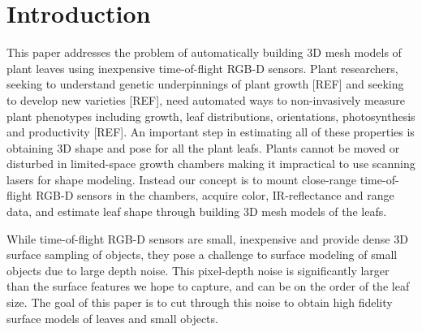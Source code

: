 \section{Introduction}
\label{sec:intro}

This paper addresses the problem of automatically building $3$D mesh models of plant leaves using inexpensive time-of-flight RGB-D sensors.  Plant researchers, seeking to understand genetic underpinnings of plant growth [REF] and seeking to develop new varieties [REF], need automated ways to non-invasively measure plant phenotypes including growth, leaf distributions, orientations, photosynthesis and productivity [REF].  An important step in estimating all of these properties is obtaining $3$D shape and pose for all the plant leafs.  Plants cannot be moved or disturbed in limited-space growth chambers making it impractical to use scanning lasers for shape modeling.  Instead our concept is to mount close-range time-of-flight RGB-D sensors in the chambers, acquire color, IR-reflectance and range data, and estimate leaf shape through building 3D mesh models of the leafs.

While time-of-flight RGB-D sensors are small, inexpensive and provide dense 3D surface sampling of objects, they pose a challenge to surface modeling of small objects due to large depth noise.  This pixel-depth noise is significantly larger than the surface features we hope to capture, and can be on the order of the leaf size.  The goal of this paper is to cut through this noise to obtain high fidelity surface models of leaves and small objects.  


